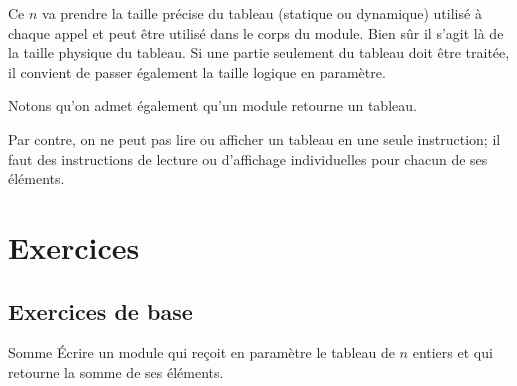 	Ce $n$ va prendre la taille précise du tableau
	(statique ou dynamique) utilisé à chaque appel et peut être utilisé
	dans le corps du module. Bien sûr il s’agit là de la taille physique du
	tableau. Si une partie seulement du tableau doit être traitée, il
	convient de passer également la taille logique en paramètre.
	

	
	Notons qu’on admet également qu’un module retourne un tableau. 
	
	
	Par contre, on ne peut pas lire ou afficher un tableau en une seule
	instruction; il faut des instructions de lecture ou
	d'affichage individuelles pour chacun de ses éléments.
	

\section{Exercices}

\subsection{Exercices de base}

\begin{Exercice}{Somme}
	Écrire un module qui reçoit en paramètre le tableau
	 de $n$ entiers 
	et qui retourne la somme de ses éléments.
\end{Exercice}

